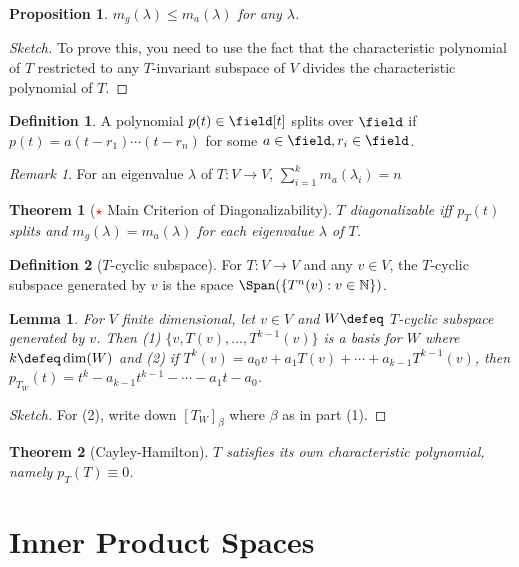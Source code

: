 \documentclass[12pt, oneside]{article}
\theoremstyle{definition}
\newtheorem{defn}{Definition}
\theoremstyle{plain}
\newtheorem{thm}{Theorem}
\newtheorem{prop}{Proposition}
\newtheorem{lemma}{Lemma}
\theoremstyle{remark}
\newtheorem{remark}{Remark}
\let\origsection=\section
\renewcommand\section[1]{\origsection{#1}\label{sec:\thesection}}
\begin{document}
\begin{prop}
  $m_g(\lambda) \leq m_a(\lambda)$ for any $\lambda$.
\end{prop}

\begin{proof}[Sketch]
  To prove this, you need to use the fact that the characteristic polynomial of $T$ restricted to any $T$-invariant subspace of $V$ divides the characteristic polynomial of $T$.
\end{proof}
\begin{defn}
  A polynomial $p(t) \in \field[t]$ splits over $\field$ if $p(t) = a (t-r_1)\cdots(t-r_n)$ for some $a \in \field, r_i \in \field$.
\end{defn}
\begin{remark}
  For an eigenvalue $\lambda$ of $T : V \to V$, $\sum_{i=1}^k m_a(\lambda_i) = n$
\end{remark}
\begin{thm}[\textcolor{red}{$\star$} Main Criterion of Diagonalizability]
  $T$ diagonalizable iff $p_T(t)$ splits and $m_g(\lambda) = m_a(\lambda)$ for each eigenvalue $\lambda$ of $T$.
\end{thm}

\begin{defn}[$T$-cyclic subspace]
  For $T : V \to V$ and any $v \in V$, the $T$-cyclic subspace generated by $v$ is the space $\Span(\{T^n(v) : v \in \mathbb{N}\})$.
\end{defn}

\begin{lemma}
  For $V$ finite dimensional, let $v \in V$ and $W \defeq$ $T$-cyclic subspace generated by $v$. Then (1) $\{v, T(v), \dots, T^{k-1}(v)\}$ is a basis for $W$ where $k \defeq \dim(W)$ and (2) if $T^{k}(v) = a_0 v + a_1 T(v) + \cdots + a_{k-1}T^{k-1}(v)$, then $p_{T_W}(t) = t^k - a_{k-1}t^{k-1} - \cdots - a_1 t - a_0$.
\end{lemma}

\begin{proof}[Sketch]
  For (2), write down $[T_W]_\beta$ where $\beta$ as in part (1).
\end{proof}

\begin{thm}[Cayley-Hamilton]
  $T$ satisfies its own characteristic polynomial, namely $p_T(T) \equiv 0$.
\end{thm}

\section{Inner Product Spaces}
\end{document}
